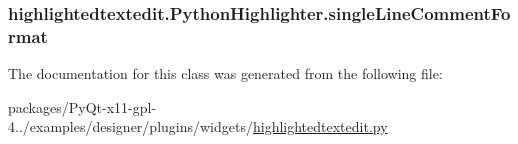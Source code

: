 \subsubsection[{single\+Line\+Comment\+Format}]{\setlength{\rightskip}{0pt plus 5cm}highlightedtextedit.\+Python\+Highlighter.\+single\+Line\+Comment\+Format}\label{classhighlightedtextedit_1_1PythonHighlighter_a225a459620b54c6674e8c34a326cb475}


The documentation for this class was generated from the following file\+:\begin{DoxyCompactItemize}
\item 
packages/\+Py\+Qt-\/x11-\/gpl-\/4../examples/designer/plugins/widgets/\hyperlink{highlightedtextedit_8py}{highlightedtextedit.\+py}\end{DoxyCompactItemize}
